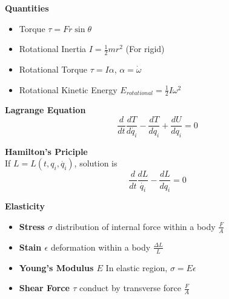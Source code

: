 \documentclass{article}
\begin{document}
\begin{multicols*}{2}
  \noindent\textbf{Quantities}
  \begin{itemize}
  \item Torque $\tau = Fr \sin\theta$
  \item Rotational Inertia $I=\frac{1}{2}mr^2$ (For rigid)
  \item Rotational Torque $\tau = I\alpha$, $\alpha = \dot{\omega}$
  \item Rotational Kinetic Energy $E_{rotational}=\frac{1}{2}I\omega^2$
  \end{itemize}

  \noindent\textbf{Lagrange Equation}
  \begin{equation*}
    \frac{d}{dt}\frac{dT}{d\dot{q_i}} - \frac{dT}{dq_i} + \frac{dU}{dq_i} = 0
  \end{equation*}

  \noindent\textbf{Hamilton's Priciple}\\
  If $L = L(t, q_i, \dot{q_i})$, solution is
  \begin{equation*}
  \frac{d}{dt}\frac{dL}{\dot{q_i}} - \frac{dL}{dq_i} = 0
  \end{equation*}

  \noindent\textbf{Elasticity}
  \begin{itemize}
  \item \textbf{Stress $\sigma$} distribution of internal force within a body $\frac{F}{A}$
  \item \textbf{Stain $\epsilon$} deformation within a body $\frac{\Delta L}{L}$
  \item \textbf{Young's Modulus $E$} In elastic region, $\sigma = E\epsilon$
  \item \textbf{Shear Force $\tau$} conduct by transverse force $\frac{F}{A}$
  \end{itemize}


\end{multicols*}
\end{document}
